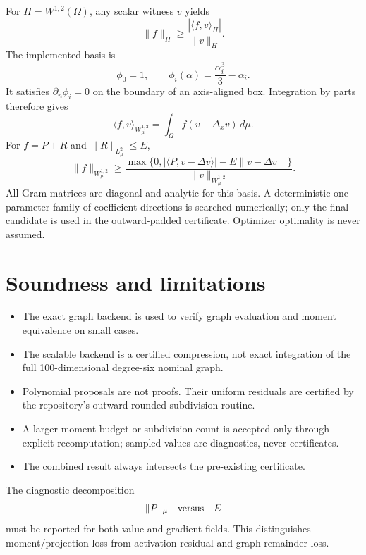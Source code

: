 \documentclass[11pt]{article}
\begin{document}
For \(H=W^{1,2}(\Omega)\), any scalar witness \(v\) yields
\[
 \|f\|_H\geq
 \frac{|\langle f,v\rangle_H|}{\|v\|_H}.
\]
The implemented basis is
\[
 \phi_0=1,\qquad
 \phi_i(\alpha)=\frac{\alpha_i^3}{3}-\alpha_i.
\]
It satisfies \(\partial_n\phi_i=0\) on the boundary of an axis-aligned box.
Integration by parts therefore gives
\[
 \langle f,v\rangle_{W^{1,2}_\mu}
 =\int_\Omega f(v-\Delta_xv)\,d\mu.
\]
For \(f=P+R\) and \(\|R\|_{L^2_\mu}\leq E\),
\[
 \|f\|_{W^{1,2}_\mu}\geq
 \frac{\max\{0,|\langle P,v-\Delta v\rangle|-E\|v-\Delta v\|\}}
 {\|v\|_{W^{1,2}_\mu}}.
\]
All Gram matrices are diagonal and analytic for this basis.  A deterministic
one-parameter family of coefficient directions is searched numerically; only
the final candidate is used in the outward-padded certificate.  Optimizer
optimality is never assumed.

\section{Soundness and limitations}

\begin{itemize}
 \item The exact graph backend is used to verify graph evaluation and moment
 equivalence on small cases.
 \item The scalable backend is a certified compression, not exact integration
 of the full 100-dimensional degree-six nominal graph.
 \item Polynomial proposals are not proofs.  Their uniform residuals are
 certified by the repository's outward-rounded subdivision routine.
 \item A larger moment budget or subdivision count is accepted only through
 explicit recomputation; sampled values are diagnostics, never certificates.
 \item The combined result always intersects the pre-existing certificate.
\end{itemize}

The diagnostic decomposition
\[
 \|P\|_\mu\quad\hbox{versus}\quad E
\]
must be reported for both value and gradient fields.  This distinguishes
moment/projection loss from activation-residual and graph-remainder loss.
\end{document}
